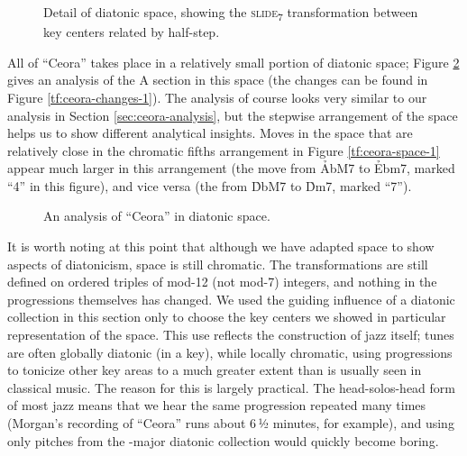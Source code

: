 \begin{figure}[tbp]
  \caption{Detail of diatonic \tf space, showing the \textsc{slide}\textsubscript{7}
    transformation between key centers related by half-step.}
  \label{tfe:diatonic-space-detail}
\end{figure}

All of ``Ceora'' takes place in a relatively small portion of diatonic \tf
space; Figure \ref{tfe:ceora-space-diatonic} gives an analysis of the A
section in this space (the changes can be found in Figure
\ref{tf:ceora-changes-1}). The analysis of course looks very similar
to our analysis in Section \ref{sec:ceora-analysis}, but the stepwise
arrangement of the space helps us to show different analytical insights. Moves in
the space that are relatively close in the chromatic fifths arrangement in
Figure \ref{tf:ceora-space-1} appear much larger in this arrangement (the move
from \h{AbM7} to \h{Ebm7}, marked ``4'' in this figure), and vice versa (the
\slideS from \h{DbM7} to \h{Dm7}, marked ``7'').

\begin{figure}[tbp]
  \caption{An analysis of ``Ceora'' in diatonic \tf space.}
  \label{tfe:ceora-space-diatonic}
\end{figure}

It is worth noting at this point that although we have adapted \tf space to
show aspects of diatonicism, \tf space is still chromatic. The transformations
are still defined on ordered triples of mod-12 (not mod-7) integers, and
nothing in the \tfo progressions themselves has changed. We used the guiding
influence of a diatonic collection in this section only to choose the key
centers we showed in particular representation of the space. This use reflects
the construction of jazz itself; tunes are often globally diatonic (in a key),
while locally chromatic, using \tfo progressions to tonicize other key areas
to a much greater extent than is usually seen in classical music. The reason
for this is largely practical. The head-solos-head form of most jazz means
that we hear the same progression repeated many times (Morgan's recording of
``Ceora'' runs about 6\,½ minutes, for example), and using only pitches from the
\Aflat-major diatonic collection would quickly become boring.

